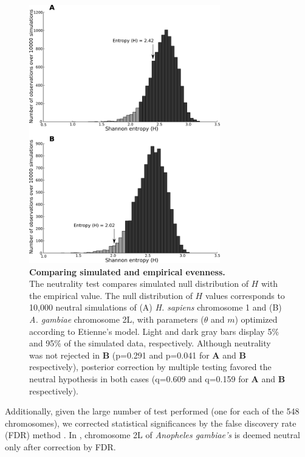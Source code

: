 \begin{figure}[!ht]
  \centering
\includegraphics[width=0.74\textwidth]{figures/material_methods/shannon_distr_hsap_chr1_agam_chr2L.pdf}
\caption[Comparing simulated and empirical evenness]{
  {\bf Comparing simulated and empirical evenness. }\\
  The neutrality test compares simulated null distribution of $H$ with the empirical value. The null distribution of $H$ values corresponds to 10,000 neutral simulations of (A) \textit{H. sapiens} chromosome 1 and (B) \textit{A. gambiae} chromosome 2L, with parameters ($\theta$ and $m$) optimized according to Etienne's model. Light and dark gray bars display 5\% and 95\% of the simulated data, respectively. Although neutrality was not rejected in \textbf{B} (p=0.291 and p=0.041 for \textbf{A} and \textbf{B} respectively), posterior correction by multiple testing favored the neutral hypothesis in both cases (q=0.609 and q=0.159 for \textbf{A} and \textbf{B} respectively).}
  \label{fig:shannon_distrib}
\end{figure}

Additionally, given the large number of test performed (one for each of the 548 chromosomes), we corrected statistical significances by the false discovery rate (FDR) method \cite{Benjamini2001}. In , chromosome 2L of \textit{Anopheles gambiae's} is deemed neutral only after correction by FDR.

